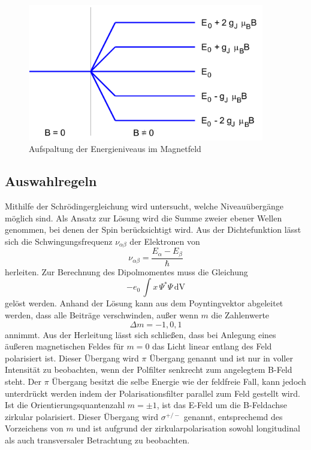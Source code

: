 \begin{figure}
  \centering
  \includegraphics[height=6cm]{./Bilder/ENiveaus.png}
  \caption{Aufspaltung der Energieniveaus im Magnetfeld \cite{V27}}
   \label{fig:Eniv}
\end{figure}

\subsection{Auswahlregeln}
Mithilfe der Schrödingergleichung wird untersucht, welche Niveauübergänge möglich sind. Als Ansatz zur Lösung wird die Summe zweier ebener Wellen genommen, bei denen der Spin berücksichtigt wird. Aus der Dichtefunktion lässt sich die Schwingungsfrequenz $\nu_{\alpha\beta}$ der Elektronen von 
\begin{equation}
  \nu_{\alpha\beta}= \frac{E_{\alpha} - E_{\beta}}{\hbar}
  \label{eqn:nu}
\end{equation}
herleiten. Zur Berechnung des Dipolmomentes muss die Gleichung
\begin{equation}
  -e_0\, \int x \, \Psi^* \Psi \, \text{dV}
  \label{}
\end{equation}
gelöst werden. Anhand der Lösung kann aus dem Poyntingvektor abgeleitet werden, dass alle Beiträge verschwinden, außer wenn $m$ die Zahlenwerte
\begin{equation}
  \Delta m = -1,0,1
\end{equation}
annimmt. Aus der Herleitung lässt sich schließen, dass bei Anlegung eines äußeren magnetischen Feldes für $m = 0$ das Licht linear entlang des Feld polarisiert ist. Dieser Übergang wird $\pi$ Übergang genannt und ist nur in voller Intensität zu beobachten, wenn der Polfilter senkrecht zum angelegtem B-Feld steht. Der $\pi$ Übergang besitzt die selbe Energie wie der feldfreie Fall, kann jedoch unterdrückt werden indem der Polarisationsfilter parallel zum Feld gestellt wird. \\
Ist die Orientierungsquantenzahl $m = \pm 1$, ist das E-Feld um die B-Feldachse zirkular polarisiert. Dieser Übergang wird $\sigma^{+/-}$ genannt, entsprechemd des Vorzeichens von $m$ und ist aufgrund der zirkularpolarisation sowohl longitudinal als auch transversaler Betrachtung zu beobachten. 

